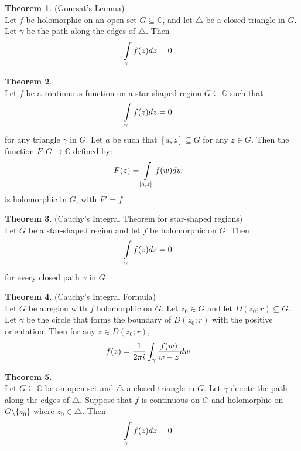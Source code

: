 \documentclass[letterpaper, 11pt]{article}
\newcommand{\C}{\mathbb{C}}   %
\newcommand{\1}{\mathds{1}}	%
\theoremstyle{definition}
\newtheorem{theorem}{Theorem}[section]
\begin{document}
\begin{theorem} (Goursat's Lemma) \\
Let $f$ be holomorphic on an open set $G \subseteq \C$, and let $\triangle$ be a closed triangle in $G$. Let $\gamma$ be the path along the edges of $\triangle$. Then
\begin{align}
\int \limits _{\gamma} f(z)dz & = 0 \notag
\end{align}

\end{theorem}

\begin{theorem} ~\\
Let $f$ be a continuous function on a star-shaped region $G \subseteq \C$ such that
\begin{align}
\int \limits _{\gamma} f(z)dz & = 0 \notag
\end{align}
for any triangle $\gamma$ in $G$. Let $a$ be such that $[a,z]\subseteq G$ for any $z \in G$. Then the function $F : G \to \C$ defined by:
\begin{align}
F(z) = \int \limits _{[a,z]} f(w) & dw \notag
\end{align}
is holomorphic in $G$, with $F' = f$
\end{theorem}

\begin{theorem} (Cauchy's Integral Theorem for star-shaped regions) \\
Let $G$ be a star-shaped region and let $f$ be holomorphic on $G$. Then
\begin{align}
\int \limits _{\gamma} f(z) dz & = 0 \notag
\end{align}
for every closed path $\gamma$ in $G$
\end{theorem}

\begin{theorem} (Cauchy's Integral Formula) \\
Let $G$ be a region with $f$ holomorphic on $G$. Let $z_0 \in G$ and let $\overline{D}(z_0; r) \subseteq G$. Let $\gamma$ be the circle that forms the boundary of $\overline{D}(z_0; r)$ with the positive orientation. Then for any $z \in D(z_0; r)$, 
\begin{align}
f(z) = \frac{1}{2 \pi i} & \int _ {\gamma} \frac{f(w)}{w-z}dw \notag
\end{align}

\end{theorem}

\begin{theorem} ~\\
Let $G \subseteq \C$ be an open set and $\triangle$ a closed triangle in $G$. Let $\gamma$ denote the path along the edges of $\triangle$. Suppose that $f$ is continuous on $G$ and holomorphic on $G \setminus \{z_0\}$ where $z_0 \in \triangle$. Then
\begin{align}
\int \limits _{\gamma} f(z) dz & = 0 \notag
\end{align}

\end{theorem}
\end{document}
